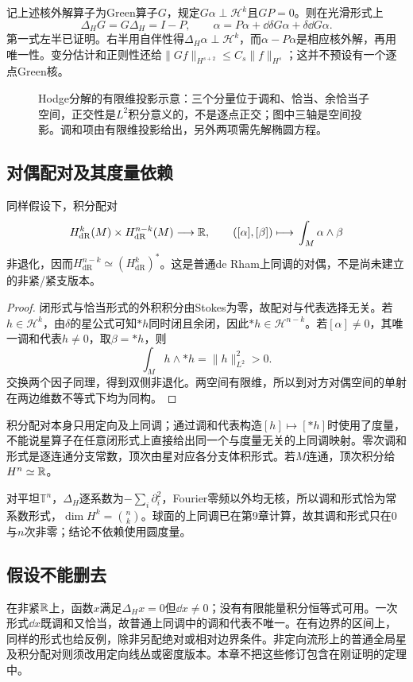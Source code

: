 记上述核外解算子为Green算子$G$，规定$G\alpha\perp\mathcal H^k$且$GP=0$。则在光滑形式上
\[
 \Delta_HG=G\Delta_H=I-P,\qquad
 \alpha=P\alpha+\dd\delta G\alpha+\delta\dd G\alpha.
\]
第一式左半已证明。右半用自伴性得$\Delta_H\alpha\perp\mathcal H^k$，而$\alpha-P\alpha$是相应核外解，再用唯一性。变分估计和正则性还给$\|Gf\|_{H^{s+2}}\leq C_s\|f\|_{H^s}$；这并不预设有一个逐点Green核。

\begin{figure}[htbp]
\centering
\caption{Hodge分解的有限维投影示意：三个分量位于调和、恰当、余恰当子空间，正交性是$L^2$积分意义的，不是逐点正交；图中三轴是空间投影。调和项由有限维投影给出，另外两项需先解椭圆方程。}
\label{fig:hodge-decomposition}
\end{figure}

\subsection*{对偶配对及其度量依赖}
\begin{theorem}\label{thm:hodge-poincare-duality}
同样假设下，积分配对
\[
 H^k_{\mathrm{dR}}(M)\times H^{n-k}_{\mathrm{dR}}(M)\longrightarrow\R,
 \qquad([\alpha],[\beta])\longmapsto\int_M\alpha\wedge\beta
\]
非退化，因而$H^{n-k}_{\mathrm{dR}}\simeq(H^k_{\mathrm{dR}})^*$。这是普通de Rham上同调的对偶，不是尚未建立的非紧/紧支版本。
\end{theorem}
\begin{proof}
闭形式与恰当形式的外积积分由Stokes为零，故配对与代表选择无关。若$h\in\mathcal H^k$，由$\delta$的星公式可知$*h$同时闭且余闭，因此$*h\in\mathcal H^{n-k}$。若$[\alpha]\ne0$，其唯一调和代表$h\ne0$，取$\beta=*h$，则
\[
 \int_Mh\wedge *h=\|h\|_{L^2}^2>0.
\]
交换两个因子同理，得到双侧非退化。两空间有限维，所以到对方对偶空间的单射在两边维数不等式下均为同构。
\end{proof}

积分配对本身只用定向及上同调；通过调和代表构造$[h]\mapsto[*h]$时使用了度量，不能说星算子在任意闭形式上直接给出同一个与度量无关的上同调映射。零次调和形式是逐连通分支常数，顶次由星对应各分支体积形式。若$M$连通，顶次积分给$H^n\simeq\mathbb{R}$。

对平坦$\mathbb T^n$，$\Delta_H$逐系数为$-\sum_i\partial_i^2$，Fourier零频以外均无核，所以调和形式恰为常系数形式，$\dim H^k=\binom nk$。球面的上同调已在第9章计算，故其调和形式只在0与$n$次非零；结论不依赖使用圆度量。

\subsection*{假设不能删去}
在非紧$\mathbb{R}$上，函数$x$满足$\Delta_Hx=0$但$\dd x\ne0$；没有有限能量积分恒等式可用。一次形式$\dd x$既调和又恰当，故普通上同调中的调和代表不唯一。在有边界的区间上，同样的形式也给反例，除非另配绝对或相对边界条件。非定向流形上的普通全局星及积分配对则须改用定向线丛或密度版本。本章不把这些修订包含在刚证明的定理中。
